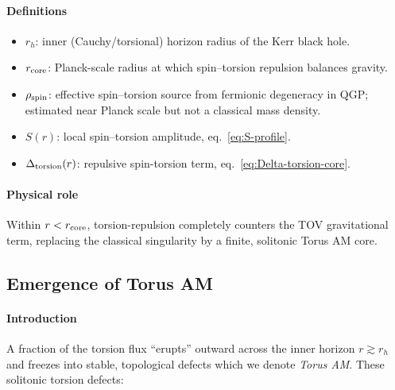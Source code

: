 \documentclass{article}
\begin{document}
\paragraph{Definitions}
\begin{itemize}
  \item \(r_h\): inner (Cauchy/torsional) horizon radius of the Kerr black hole.
  \item \(r_{\rm core}\): Planck-scale radius at which spin–torsion repulsion balances gravity.
\item \(\rho_{\rm spin}\): effective spin–torsion source from fermionic degeneracy in QGP; estimated near Planck scale but not a classical mass density.

  \item \(S(r)\): local spin–torsion amplitude, eq.~\eqref{eq:S-profile}.
  \item \(\Delta_{\rm torsion}(r)\): repulsive spin-torsion term, eq.~\eqref{eq:Delta-torsion-core}.
\end{itemize}

\paragraph{Physical role}
Within \(r<r_{\rm core}\), torsion-repulsion completely counters the TOV gravitational term, replacing
the classical singularity by a finite, solitonic Torus AM core.

\medskip
\begin{center}
\end{center}
\medskip


\subsection{Emergence of Torus AM}
\label{sec:emergence-torus-prime}
\paragraph{Introduction}
A fraction of the torsion flux “erupts” outward across the inner horizon \(r\gtrsim r_h\) and
freezes into stable, topological defects which we denote \emph{Torus AM}.  These solitonic
torsion defects:
\end{document}
